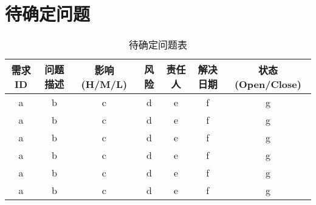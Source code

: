 \chapter{待确定问题}
\begin{table}[htbp]
\centering
\caption{待确定问题表} \label{tab:tbd_problems}
\begin{tabular}{|c|c|c|c|c|c|c|}
    \hline
    需求ID & 问题描述 & 影响(H/M/L) & 风险 & 责任人 & 解决日期 & 状态(Open/Close) \\
    \hline
    a & b & c & d & e & f & g\\
    \hline
    a & b & c & d & e & f & g\\
    \hline
    a & b & c & d & e & f & g\\
    \hline
    a & b & c & d & e & f & g\\
    \hline
    a & b & c & d & e & f & g\\
    \hline
    a & b & c & d & e & f & g\\
    \hline
\end{tabular}
\end{table}